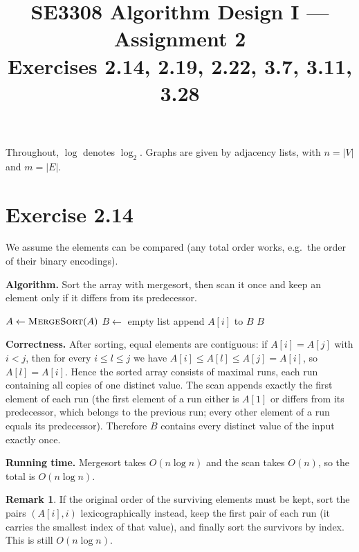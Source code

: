 \documentclass[11pt]{article}
\title{SE3308 Algorithm Design I --- Assignment 2\\[0.3em]
  \large Exercises 2.14, 2.19, 2.22, 3.7, 3.11, 3.28}
\author{\studentname\ifx\studentid\empty\else\quad\studentid\fi}
\date{}
\theoremstyle{definition}
\newtheorem*{remark}{Remark}
\begin{document}
\maketitle

Throughout, $\log$ denotes $\log_2$. Graphs are given by adjacency lists, with $n=|V|$ and $m=|E|$.

\section*{Exercise 2.14}

We assume the elements can be compared (any total order works, e.g.\ the order of their binary encodings).

\textbf{Algorithm.} Sort the array with mergesort, then scan it once and keep an element only if it differs from
its predecessor.

\begin{algorithm}[H]
\caption{Removing duplicates}
\begin{algorithmic}[1]
  \State $A\gets\Call{MergeSort}{A}$
  \State $B\gets$ empty list
      \State append $A[i]$ to $B$
    \EndIf
  \EndFor
  \State \Return $B$
\EndFunction
\end{algorithmic}
\end{algorithm}

\textbf{Correctness.} After sorting, equal elements are contiguous: if $A[i]=A[j]$ with $i<j$, then for every
$i\le l\le j$ we have $A[i]\le A[l]\le A[j]=A[i]$, so $A[l]=A[i]$. Hence the sorted array consists of maximal
runs, each run containing all copies of one distinct value. The scan appends exactly the first element of each run
(the first element of a run either is $A[1]$ or differs from its predecessor, which belongs to the previous run;
every other element of a run equals its predecessor). Therefore $B$ contains every distinct value of the input
exactly once.

\textbf{Running time.} Mergesort takes $O(n\log n)$ and the scan takes $O(n)$, so the total is
$\boxed{O(n\log n)}$.

\begin{remark}
If the original order of the surviving elements must be kept, sort the pairs $(A[i],i)$ lexicographically instead,
keep the first pair of each run (it carries the smallest index of that value), and finally sort the survivors by
index. This is still $O(n\log n)$.
\end{remark}
\end{document}
